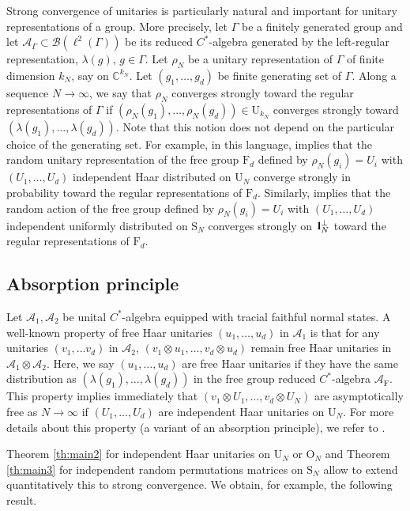 \documentclass[11pt]{article}
\renewcommand{\star}{{\mathrm{F}}}
\newcommand{\cA}{\mathcal{A}}
\newcommand{\dF}{\mathrm{F}}
\newcommand{\dU}{\mathrm {U}}
\newcommand{\dS}{\mathrm{S}}
\newcommand{\dO}{\mathrm{O}}
\newcommand{\dC}{\mathbb {C}}
\newcommand{\cB}{\mathcal{B}}
\newcommand{\1}{1\!\!{\sf I}}
\newcommand{\IND}{\1}
\begin{document}
Strong convergence of unitaries is particularly natural and important for unitary representations of a group. More precisely, let $\Gamma$ be a finitely generated group and let $\cA_\Gamma \subset \cB( \ell^2(\Gamma))$ be its reduced $C^*$-algebra generated by the left-regular representation, $\lambda(g)$, $g \in \Gamma$. Let $\rho_N$ be a unitary representation of $\Gamma$ of finite dimension $k_N$, say on $\dC^{k_N}$. Let $(g_1,\ldots,g_d)$ be finite generating set of $\Gamma$. Along a sequence $N \to \infty$, we say that $\rho_N$ converges strongly toward the regular representations of $\Gamma$ if $(\rho_N(g_1),\ldots,\rho_N(g_d)) \in \dU_{k_N}$ converges strongly toward $(\lambda(g_1),\ldots,\lambda(g_d))$. Note that this notion does not depend on the particular choice of the generating set. For example, in this language, \cite{MR3205602} implies that the random unitary representation of the free group $\dF_d$ defined by $\rho_N (g_i) = U_i$ with $(U_1,\ldots,U_d)$ independent Haar distributed on $\dU_N$ converge strongly in probability toward the regular representations of $\dF_d$. Similarly, \cite{MR4024563} implies that the random action of the free group defined by $\rho_N(g_i) = U_i$ with $(U_1,\ldots,U_d)$ independent uniformly distributed on $\dS_N$ converges strongly on $\IND_N^\perp$ toward the regular representations of $\dF_d$. 

\subsection{Absorption principle}

Let $\cA_1,\cA_2$ be unital $C^*$-algebra equipped with tracial faithful normal states.   A well-known property of free Haar unitaries $(u_1,\ldots , u_d)$ in $\cA_1$ is that for any unitaries $(v_1,\ldots v_d)$ in $\cA_2$, $(v_1\otimes u_1,\ldots,v_d \otimes u_d)$ remain free Haar unitaries in $\cA_1 \otimes \cA_2$.  Here, we say $(u_1,\ldots,u_d)$ are free Haar unitaries if they have the same distribution as $(\lambda(g_1), \ldots, \lambda(g_d))$ in the free group reduced $C^*$-algebra $\cA_\star$.
This property implies immediately that $(v_1\otimes U_1,\ldots,v_d\otimes U_N)$ are asymptotically free as $N \to \infty$ if $(U_1,\ldots,U_d)$ are independent Haar unitaries on $\dU_N$. 
For more details about this property (a variant of an absorption principle), we refer to \cite{MR1479116,MR3573218,collins2022asymptotic}. 

Theorem \ref{th:main2} for independent Haar unitaries on $\dU_N$ or $\dO_N$ and Theorem \ref{th:main3} for independent random permutations matrices on $\dS_N$ allow to extend quantitatively this to strong convergence. We obtain, for example, the following result. 
\end{document}
